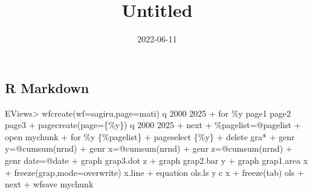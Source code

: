 \documentclass[
]{article}
\title{Untitled}
\author{}
\date{\vspace{-2.5em}2022-06-11}
\newenvironment{Shaded}{\begin{snugshade}}{\end{snugshade}}
\newcommand{\NormalTok}[1]{#1}
\begin{document}
\maketitle

{
\setcounter{tocdepth}{2}
\tableofcontents
}
\hypertarget{r-markdown}{%
\subsection{R Markdown}\label{r-markdown}}

\begin{Shaded}
\begin{Highlighting}[]
\NormalTok{EViews\textgreater{} wfcreate(wf=sagiru,page=mati) q 2000 2025}
\NormalTok{+ for \%y page1 page2 page3  }
\NormalTok{+ pagecreate(page=\{\%y\}) q 2000 2025}
\NormalTok{+ next}
\NormalTok{+ \%pagelist=@pagelist}
\NormalTok{+ \textquotesingle{}open mychunk}
\NormalTok{+ for \%y \{\%pagelist\}}
\NormalTok{+ pageselect \{\%y\}}
\NormalTok{+ \textquotesingle{}delete gra*}
\NormalTok{+ genr y=@cumsum(nrnd)}
\NormalTok{+ genr x=@cumsum(nrnd)}
\NormalTok{+ genr z=@cumsum(nrnd)}
\NormalTok{+ genr date=@date}
\NormalTok{+                      graph grap3.dot z  }
\NormalTok{+                            graph grap2.bar y }
\NormalTok{+                            graph grap1.area x  }
\NormalTok{+    freeze(grap,mode=overwrite) x.line}
\NormalTok{+ equation ols.ls y c x}
\NormalTok{+ freeze(tab) ols}
\NormalTok{+ next}
\NormalTok{+ wfsave mychunk}
\end{Highlighting}
\end{Shaded}
\end{document}
